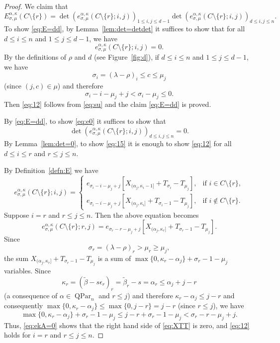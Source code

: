 \documentclass[12pt]{amsart}
\numberwithin{equation}{section}
\theoremstyle{definition}
\newcommand\wb{\widetilde{\beta}}
\newcommand\QPar{\operatorname{QPar}}
\begin{document}
\begin{proof}
 We claim that 
\begin{equation}\label{eq:E=dd}
  E_{\sigma,\mu}^{\alpha,\kappa}(C\setminus\{r\})
  =  \det(e_{\sigma,\mu}^{\alpha,\kappa}(C\setminus\{r\};i,j))_{1\le i,j\le d-1}
  \det(e_{\sigma,\mu}^{\alpha,\kappa}(C\setminus\{r\};i,j))_{d\le i,j\le n}.
\end{equation}
To show \eqref{eq:E=dd}, by Lemma~\ref{lem:det=detdet} it suffices to show that
for all $d\le i\le n$ and $1\le j\le d-1$, we have
\begin{equation}
  \label{eq:12}
 e_{\sigma,\mu}^{\alpha,\kappa}(C\setminus\{r\};i,j) = 0.
\end{equation}
By the definitions of $\rho$ and $d$ (see Figure~\ref{fig:d}), if $d\le i\le n$
and $1\le j\le d-1$, we have
\[
\sigma_i=(\lambda-\rho)_i \le c \le \mu_j
\]
(since $(j, c) \in \mu$)
 and therefore
\begin{equation}\label{eq:su}
 \sigma_i-i-\mu_j+j < \sigma_i-\mu_j \le 0. 
\end{equation}
Then \eqref{eq:12} follows from \eqref{eq:su} and the claim \eqref{eq:E=dd} is proved.


By \eqref{eq:E=dd}, to show \eqref{eq:e0} it suffices to show that
\begin{equation}
  \label{eq:15}
\det(e_{\sigma,\mu}^{\alpha,\kappa}(C\setminus\{r\};i,j))_{d\le i,j\le n} = 0.  
\end{equation}
By Lemma~\ref{lem:det=0}, to show \eqref{eq:15} it is enough to show
\eqref{eq:12} for all $d\le i\le r$ and $r\le j\le n$.

By Definition~\ref{defn:E} we have
    \[
      e^{\alpha,\kappa}_{\sigma,\mu}(C\setminus\{r\};i,j)=
      \begin{cases}
      e_{\sigma_i-i-\mu_j+j}[X_{(\alpha_j,\kappa_i-1]} +
      T_{\sigma_i}-T_{\mu_j}],
      & \mbox{if $i\in C\setminus\{r\}$},\\
      e_{\sigma_i-i-\mu_j+j}[X_{(\alpha_j,\kappa_i]} +
      T_{\sigma_i-1}-T_{\mu_j}],
      & \mbox{if $i\not\in C\setminus\{r\}$}.
      \end{cases}
  \]
Suppose $i=r$ and $r\le j\le n$. Then the above equation becomes
  \begin{equation}\label{eq:XTT}
    e^{\alpha,\kappa}_{\sigma,\mu}(C\setminus\{r\};r,j)
    =e_{\sigma_r-r-\mu_j+j}[X_{(\alpha_j,\kappa_r]} + T_{\sigma_r-1}-T_{\mu_j}].
  \end{equation}
  Since
  \[
\sigma_r=(\lambda-\rho)_r>\mu_r\ge\mu_j,
\]
the sum
$X_{(\alpha_j,\kappa_r]} + T_{\sigma_r-1}-T_{\mu_j}$ is a sum of 
$\max\{0,\kappa_r-\alpha_j\} +\sigma_r-1-\mu_j$ variables. Since
\[
\kappa_r = (\wb-s\epsilon_r)_r = \wb_r-s = \alpha_r \le \alpha_j + j-r
\]
(a consequence of $\alpha \in \QPar_n$ and $r \le j$)
and therefore $\kappa_r-\alpha_j \le j-r$
and consequently $\max\{0,\kappa_r-\alpha_j\}
\le \max\{0,j-r\} = j-r$ (since $r\le j$), we have
\[
\max\{0,\kappa_r-\alpha_j\} +\sigma_r-1-\mu_j
\le j-r+\sigma_r-1-\mu_j < \sigma_r-r-\mu_j+j.
\]
Thus, \eqref{eq:ekA=0} shows that
the right hand side of \eqref{eq:XTT} is zero, and
\eqref{eq:12} holds for $i = r$ and $r\le j\le n$.


\end{proof}
\end{document}
